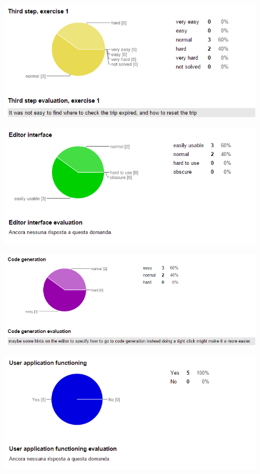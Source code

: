  \begin{figure}[H]
   \centering
   \includegraphics[width=\linewidth]{pictures/survey4.png}
 \end{figure}

 \begin{figure}[H]
   \centering
   \includegraphics[width=\linewidth]{pictures/survey5.png}
 \end{figure}

 \begin{figure}[H]
   \centering
   \includegraphics[width=\linewidth]{pictures/survey6.png}
 \end{figure}

 \begin{figure}[H]
   \centering
   \includegraphics[width=\linewidth]{pictures/survey7.png}
 \end{figure}

